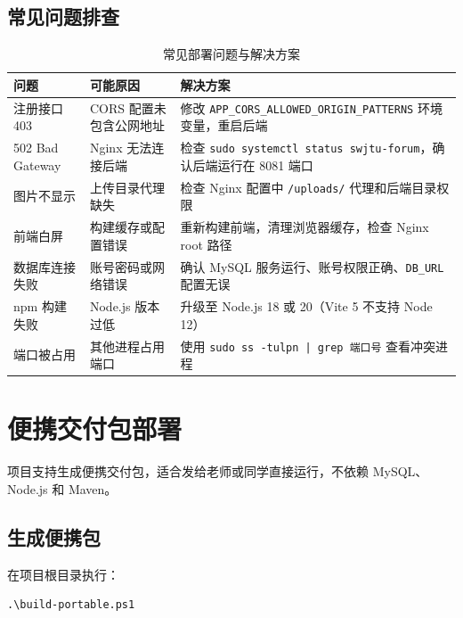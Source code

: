 \documentclass[bwprint]{report}
\begin{document}
\subsection{常见问题排查}

\begin{table}[H]
    \caption{常见部署问题与解决方案}
    \label{tab:troubleshooting}
    \centering
    \small
    \begin{tabular}{p{}p{}p{}}
        \toprule[1.5pt]
        问题 & 可能原因 & 解决方案 \\
        \midrule[1pt]
        注册接口 403 & CORS 配置未包含公网地址 & 修改 \texttt{APP\_CORS\_ALLOWED\_ORIGIN\_PATTERNS} 环境变量，重启后端 \\
        502 Bad Gateway & Nginx 无法连接后端 & 检查 \texttt{sudo systemctl status swjtu-forum}，确认后端运行在 8081 端口 \\
        图片不显示 & 上传目录代理缺失 & 检查 Nginx 配置中 \texttt{/uploads/} 代理和后端目录权限 \\
        前端白屏 & 构建缓存或配置错误 & 重新构建前端，清理浏览器缓存，检查 Nginx root 路径 \\
        数据库连接失败 & 账号密码或网络错误 & 确认 MySQL 服务运行、账号权限正确、\texttt{DB\_URL} 配置无误 \\
        npm 构建失败 & Node.js 版本过低 & 升级至 Node.js 18 或 20（Vite 5 不支持 Node 12） \\
        端口被占用 & 其他进程占用端口 & 使用 \texttt{sudo ss -tulpn | grep 端口号} 查看冲突进程 \\
        \bottomrule[1.5pt]
    \end{tabular}
\end{table}

\section{便携交付包部署}

项目支持生成便携交付包，适合发给老师或同学直接运行，不依赖 MySQL、Node.js 和 Maven。

\subsection{生成便携包}

在项目根目录执行：

\begin{lstlisting}
.\build-portable.ps1
\end{lstlisting}
\end{document}
